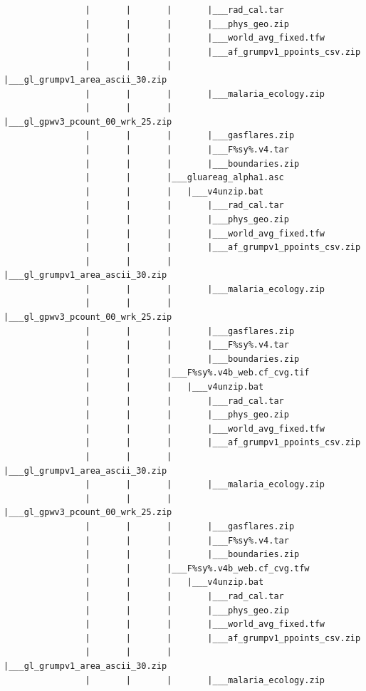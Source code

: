 \documentclass[]{book}
\begin{document}
\begin{verbatim}
                |       |       |       |___rad_cal.tar
                |       |       |       |___phys_geo.zip
                |       |       |       |___world_avg_fixed.tfw
                |       |       |       |___af_grumpv1_ppoints_csv.zip
                |       |       |       |___gl_grumpv1_area_ascii_30.zip
                |       |       |       |___malaria_ecology.zip
                |       |       |       |___gl_gpwv3_pcount_00_wrk_25.zip
                |       |       |       |___gasflares.zip
                |       |       |       |___F%sy%.v4.tar
                |       |       |       |___boundaries.zip
                |       |       |___gluareag_alpha1.asc
                |       |       |   |___v4unzip.bat
                |       |       |       |___rad_cal.tar
                |       |       |       |___phys_geo.zip
                |       |       |       |___world_avg_fixed.tfw
                |       |       |       |___af_grumpv1_ppoints_csv.zip
                |       |       |       |___gl_grumpv1_area_ascii_30.zip
                |       |       |       |___malaria_ecology.zip
                |       |       |       |___gl_gpwv3_pcount_00_wrk_25.zip
                |       |       |       |___gasflares.zip
                |       |       |       |___F%sy%.v4.tar
                |       |       |       |___boundaries.zip
                |       |       |___F%sy%.v4b_web.cf_cvg.tif
                |       |       |   |___v4unzip.bat
                |       |       |       |___rad_cal.tar
                |       |       |       |___phys_geo.zip
                |       |       |       |___world_avg_fixed.tfw
                |       |       |       |___af_grumpv1_ppoints_csv.zip
                |       |       |       |___gl_grumpv1_area_ascii_30.zip
                |       |       |       |___malaria_ecology.zip
                |       |       |       |___gl_gpwv3_pcount_00_wrk_25.zip
                |       |       |       |___gasflares.zip
                |       |       |       |___F%sy%.v4.tar
                |       |       |       |___boundaries.zip
                |       |       |___F%sy%.v4b_web.cf_cvg.tfw
                |       |       |   |___v4unzip.bat
                |       |       |       |___rad_cal.tar
                |       |       |       |___phys_geo.zip
                |       |       |       |___world_avg_fixed.tfw
                |       |       |       |___af_grumpv1_ppoints_csv.zip
                |       |       |       |___gl_grumpv1_area_ascii_30.zip
                |       |       |       |___malaria_ecology.zip

\end{verbatim}
\end{document}
